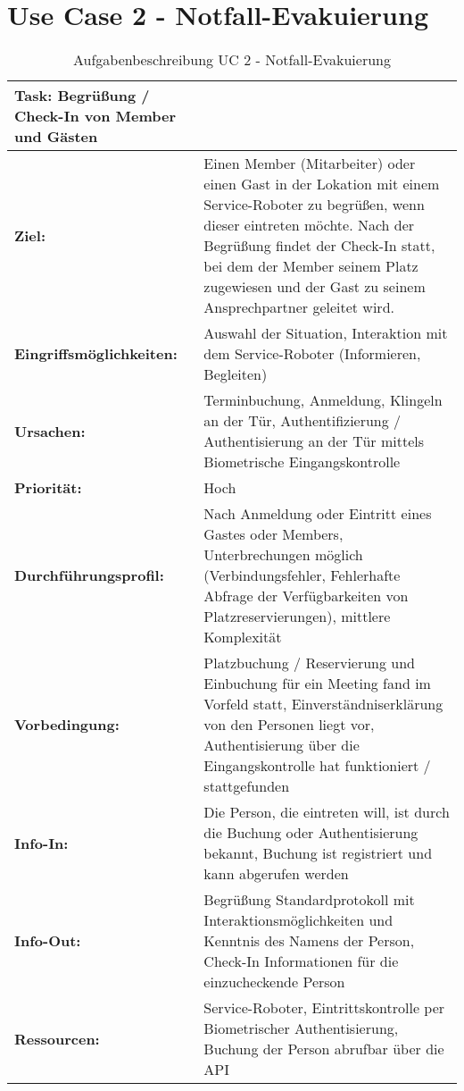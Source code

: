 \section*{Use Case 2 - Notfall-Evakuierung}
\begin{table}[hbt!]
    \begin{center}
        \begin{tabular}{| p{3cm} | p{12.75cm} | }
            \hline
                \textbf{Task: Begrüßung / Check-In von Member und Gästen} \\
            \hline
                \textbf{Ziel:} & Einen Member (Mitarbeiter) oder einen Gast in der Lokation mit einem Service-Roboter zu begrüßen, wenn dieser eintreten möchte. Nach der Begrüßung findet der Check-In statt, bei dem der Member seinem Platz zugewiesen und der Gast zu seinem Ansprechpartner geleitet wird. \\
            \hline
                \textbf{Eingriffsmöglichkeiten:} & Auswahl der Situation, Interaktion mit dem Service-Roboter (Informieren, Begleiten)  \\
            \hline
                \textbf{Ursachen:} & Terminbuchung, Anmeldung, Klingeln an der Tür, Authentifizierung / Authentisierung an der Tür mittels Biometrische Eingangskontrolle \\
            \hline
                \textbf{Priorität:} & Hoch \\
            \hline
                \textbf{Durchführungsprofil:} & Nach Anmeldung oder Eintritt eines Gastes oder Members, Unterbrechungen möglich (Verbindungsfehler, Fehlerhafte Abfrage der Verfügbarkeiten von Platzreservierungen), mittlere Komplexität \\ 
            \hline
                \textbf{Vorbedingung:} & Platzbuchung / Reservierung und Einbuchung für ein Meeting fand im Vorfeld statt, Einverständniserklärung von den Personen liegt vor, Authentisierung über die Eingangskontrolle hat funktioniert / stattgefunden \\
            \hline 
                \textbf{Info-In:} & Die Person, die eintreten will, ist durch die Buchung oder Authentisierung bekannt, Buchung ist registriert und kann abgerufen werden \\
            \hline
                \textbf{Info-Out:} & Begrüßung Standardprotokoll mit Interaktionsmöglichkeiten und Kenntnis des Namens der Person, Check-In Informationen für die einzucheckende Person \\
            \hline
                \textbf{Ressourcen:} & Service-Roboter, Eintrittskontrolle per Biometrischer Authentisierung, Buchung der Person abrufbar über die API \\
            \hline
        \end{tabular}
    \end{center}
    \caption{Aufgabenbeschreibung UC 2 - Notfall-Evakuierung}
    \label{tab:evacuation}
\end{table}

